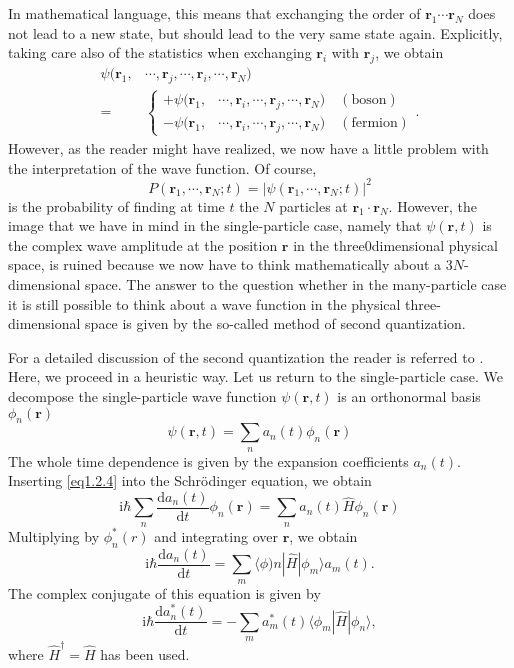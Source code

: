 \documentclass[twoside,11pt]{report}
\def\be{\begin{equation}}
\def\ee{\end{equation}}
\def\ii{\text{i}}
\def\dd{\text{d}}
\begin{document}
In mathematical language, this means that exchanging the order of $\bm r_1\cdots\bm r_N$ does not lead to a new state, but should lead to the very same state again. Explicitly, taking care also of the statistics when exchanging $\bm r_i$ with $\bm r_j$, we obtain
\be\begin{split}
\psi(\bm r_1,&\cdots,\bm r_j,\cdots,\bm r_i,\cdots,\bm r_N)\\
=&\begin{cases}
+\psi(\bm r_1,&\cdots,\bm r_i,\cdots,\bm r_j,\cdots,\bm r_N)\quad  (\text{boson})\\
-\psi(\bm r_1,&\cdots,\bm r_i,\cdots,\bm r_j,\cdots,\bm r_N)\quad  (\text{fermion})
\end{cases}. 
\end{split}\ee
However, as the reader might have realized, we now have a little problem with the interpretation of the wave function. Of course, 
\be
P(\bm r_1,\cdots,\bm r_N;t)=|\psi(\bm r_1,\cdots,\bm r_N;t)|^2
\ee
is the probability of finding at time $t$ the $N$ particles at $\bm r_1\cdot\bm r_N$. However, the image that we have in mind in the single-particle case, namely that $\psi(\bm r,t)$ is the complex wave amplitude at the position $\bm r$ in the three0dimensional physical space, is ruined because we now have to think mathematically about a $3N$-dimensional space. The answer to the question whether in the many-particle case it is still possible to think about a wave function in the physical three-dimensional space is given by the so-called method of second quantization. 

For a detailed discussion of the second quantization the reader is referred to \cite{3}. Here, we proceed in a heuristic way. Let us return to the single-particle case. We decompose the single-particle wave function $\psi(\bm r,t)$ is an orthonormal basis $\phi_n(\bm r)$
\be\label{eq1.2.4}
\psi(\bm r,t)=\sum_na_n(t)\phi_n(\bm r)
\ee
The whole time dependence is given by the expansion coefficients $a_n(t)$. Inserting \eqref{eq1.2.4} into the Schrödinger equation, we obtain
\be
\ii\hbar\sum_n\frac{\dd a_n(t)}{\dd t}\phi_n(\bm r)=\sum_na_n(t)\hat{H}\phi_n(\bm r)
\ee
Multiplying by $\phi_n^*(r)$ and integrating over $\bm r$, we obtain
\be\label{eq1.2.6}
\ii\hbar\frac{\dd a_n(t)}{\dd t}=\sum_m\langle\phi)n|\hat{H}|\phi_m\rangle a_m(t).
\ee
The complex conjugate of this equation is given by
\be\label{eq1.2.7}
\ii\hbar\frac{\dd a_n^*(t)}{\dd t}=-\sum_m a_m^*(t)\langle\phi_m|\hat{H}|\phi_n\rangle, 
\ee
where $\hat{H}^\dagger=\hat{H}$ has been used. 
\end{document}
